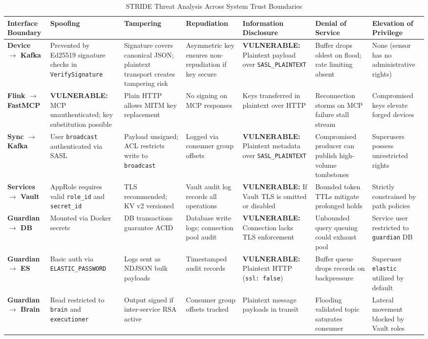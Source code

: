 \documentclass[10pt,a4paper]{report}
\begin{document}
\begin{table}[htbp]
\centering
\scriptsize
\caption{STRIDE Threat Analysis Across System Trust Boundaries}
\label{tab:stride_matrix}
\begin{tabularx}{\textwidth}{lXXXXXX}
\toprule
\textbf{Interface Boundary} & \textbf{Spoofing} & \textbf{Tampering} & \textbf{Repudiation} & \textbf{Information Disclosure} & \textbf{Denial of Service} & \textbf{Elevation of Privilege} \\
\midrule
\textbf{Device $\rightarrow$ Kafka} & Prevented by Ed25519 signature checks in \texttt{VerifySignature} & Signature covers canonical JSON; plaintext transport creates tampering risk & Asymmetric key ensures non-repudiation if key secure & \textbf{VULNERABLE:} Plaintext payload over \texttt{SASL\_PLAINTEXT} & Buffer drops oldest on flood; rate limiting absent & None (sensor has no administrative rights) \\
\textbf{Flink $\rightarrow$ FastMCP} & \textbf{VULNERABLE:} MCP unauthenticated; key substitution possible & Plain HTTP allows MITM key replacement & No signing on MCP responses & Keys transferred in plaintext over HTTP & Reconnection storms on MCP failure stall stream & Compromised keys elevate forged devices \\
\textbf{Sync $\rightarrow$ Kafka} & User \texttt{broadcast} authenticated via SASL & Payload unsigned; ACL restricts write to \texttt{broadcast} & Logged via consumer group offsets & \textbf{VULNERABLE:} Plaintext metadata over \texttt{SASL\_PLAINTEXT} & Compromised producer can publish high-volume tombstones & Superusers possess unrestricted rights \\
\textbf{Services $\rightarrow$ Vault} & AppRole requires valid \texttt{role\_id} and \texttt{secret\_id} & TLS recommended; KV v2 versioned & Vault audit log records all operations & \textbf{VULNERABLE:} If Vault TLS is omitted or disabled & Bounded token TTLs mitigate prolonged holds & Strictly constrained by path policies \\
\textbf{Guardian $\rightarrow$ DB} & Mounted via Docker secrets & DB transactions guarantee ACID & Database write logs; connection pool audit & \textbf{VULNERABLE:} Connection lacks TLS enforcement & Unbounded query queuing could exhaust pool & Service user restricted to \texttt{guardian} DB \\
\textbf{Guardian $\rightarrow$ ES} & Basic auth via \texttt{ELASTIC\_PASSWORD} & Logs sent as NDJSON bulk payloads & Timestamped audit records & \textbf{VULNERABLE:} Plaintext HTTP (\texttt{ssl: false}) & Buffer queue drops records on backpressure & Superuser \texttt{elastic} utilized by default \\
\textbf{Guardian $\rightarrow$ Brain} & Read restricted to \texttt{brain} and \texttt{executioner} & Output signed if inter-service RSA active & Consumer group offsets tracked & Plaintext message payloads in transit & Flooding validated topic saturates consumer & Lateral movement blocked by Vault roles \\
\bottomrule
\end{tabularx}
\end{table}
\end{document}
